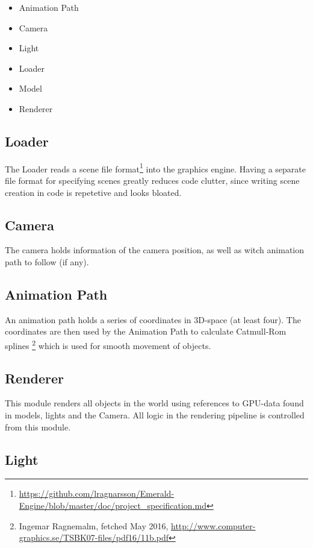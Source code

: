 \documentclass{article}
\begin{document}
\begin{itemize}
    \item Animation Path
    \item Camera
    \item Light
    \item Loader
    \item Model
    \item Renderer
\end{itemize}

\subsection{Loader}

The Loader reads a scene file format\footnote{\url{https://github.com/lragnarsson/Emerald-Engine/blob/master/doc/project_specification.md}} into the graphics engine. Having a separate file format for specifying scenes greatly reduces code clutter, since writing scene creation in code is repetetive and looks bloated.

\subsection{Camera}

The camera holds information of the camera position, as well as witch animation path to follow (if any).

\subsection{Animation Path}

An animation path holds a series of coordinates in 3D-space (at least four). The coordinates are then used by the Animation Path to calculate Catmull-Rom splines \footnote{Ingemar Ragnemalm, fetched May 2016, \url{http://www.computer-graphics.se/TSBK07-files/pdf16/11b.pdf}} which is used for smooth movement of objects.

\subsection{Renderer}

This module renders all objects in the world using references to GPU-data found in models, lights and the Camera. All logic in the rendering pipeline is controlled from this module.

\subsection{Light}
\end{document}
